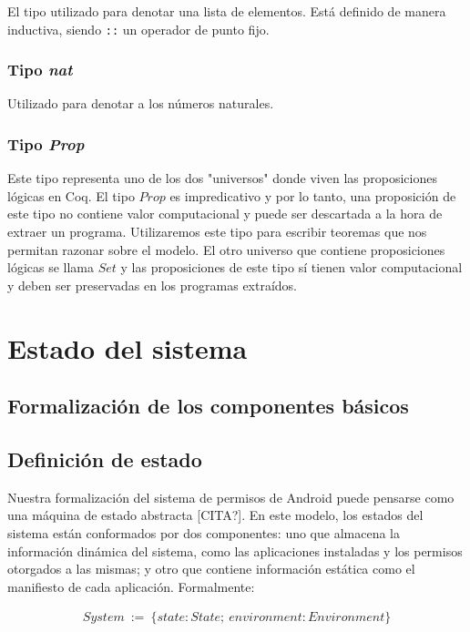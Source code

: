 El tipo utilizado para denotar una lista de elementos. Está definido de manera inductiva, siendo
\texttt{::} un operador de punto fijo. 

\subsubsection*{Tipo \textit{nat}}
Utilizado para denotar a los números naturales.

\subsubsection*{Tipo \textit{Prop}}

Este tipo representa uno de los dos "universos" donde viven las proposiciones lógicas en Coq. El tipo
$Prop$ es impredicativo y por lo tanto, una proposición de este tipo no contiene valor
computacional\cite{proof-irrelevance} y puede ser descartada a la hora de extraer un programa.
Utilizaremos este tipo para escribir teoremas que nos permitan razonar sobre el modelo. El otro
universo que contiene proposiciones lógicas se llama $Set$ y las proposiciones de este tipo sí tienen
valor computacional y deben ser preservadas en los programas extraídos.


\section{Estado del sistema}
\label{section:formalization:state}

\subsection{Formalización de los componentes básicos}

\subsection{Definición de estado}
Nuestra formalización del sistema de permisos de Android puede pensarse como una máquina de estado
abstracta [CITA?]. En este modelo, los estados del sistema están conformados por dos componentes: uno
que almacena la información dinámica del sistema, como las aplicaciones instaladas y los permisos otorgados
a las mismas; y otro que contiene información estática como el manifiesto de cada aplicación. Formalmente:

\begin{align*}
System\ :=\ \{ state: State;\ environment: Environment \}
\end{align*}


